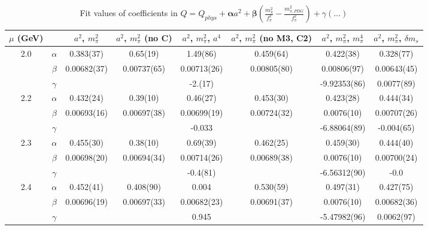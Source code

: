 \documentclass[12pt]{extarticle}
\begin{document}
\begin{table}[h!]
\begin{center}
\begin{tabular}{|c c|c|c|c|c|c|c|}
\hline
$\mu$ (GeV) &  & $a^2$, $m_\pi^2$& $a^2$, $m_\pi^2$ (no C)& $a^2$, $m_\pi^2$, $a^4$& $a^2$, $m_\pi^2$ (no M3, C2)& $a^2$, $m_\pi^2$, $m_\pi^4$& $a^2$, $m_\pi^2$, $\delta m_s$\\
\hline
\multirow{3}{0.5in}{2.0} & $\alpha$ & 0.383(37)& 0.65(19)& 1.49(86)& 0.459(64)& 0.422(38)& 0.328(77)\\
 & $\beta$ & 0.00682(37)& 0.00737(65)& 0.00713(26)& 0.00805(80)& 0.00806(97)& 0.00643(45)\\
 & $\gamma$ &  &  & -2.(17)&  & -9.92353(86)& 0.0077(89)\\
\hline
\multirow{3}{0.5in}{2.2} & $\alpha$ & 0.432(24)& 0.39(10)& 0.46(27)& 0.453(30)& 0.423(28)& 0.444(34)\\
 & $\beta$ & 0.00693(16)& 0.00697(38)& 0.00699(19)& 0.00724(32)& 0.0076(10)& 0.00707(26)\\
 & $\gamma$ &  &  & -0.033&  & -6.88064(89)& -0.004(65)\\
\hline
\multirow{3}{0.5in}{2.3} & $\alpha$ & 0.455(30)& 0.38(10)& 0.69(39)& 0.462(25)& 0.459(30)& 0.444(40)\\
 & $\beta$ & 0.00698(20)& 0.00694(34)& 0.00714(26)& 0.00689(38)& 0.0076(10)& 0.00700(24)\\
 & $\gamma$ &  &  & -0.4(81)&  & -6.56312(90)& -0.0\\
\hline
\multirow{3}{0.5in}{2.4} & $\alpha$ & 0.452(41)& 0.408(90)& 0.004& 0.530(59)& 0.497(31)& 0.427(75)\\
 & $\beta$ & 0.00696(19)& 0.00697(33)& 0.00682(23)& 0.00691(37)& 0.0076(10)& 0.00682(36)\\
 & $\gamma$ &  &  & 0.945&  & -5.47982(96)& 0.0062(97)\\
\hline
\end{tabular}
\caption{Fit values of coefficients in $Q = Q_{phys} + \mathbf{\alpha} a^2 + \mathbf{\beta}\left(\frac{m_\pi^2}{f_\pi^2}-\frac{m_{\pi,PDG}^2}{f_\pi^2}\right) + \gamma(\ldots)$}
\end{center}
\end{table}







\end{document}
